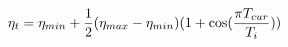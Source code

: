 \documentclass[preview]{standalone}
\begin{document}
\begin{align*}
\special{dvisvgm:raw <g id='unique000'>}\eta_t = \eta_{min} + \frac{1}{2}(\eta_{max} - \eta_{min}) \special{dvisvgm:raw </g>}\special{dvisvgm:raw <g id='unique001'>}(1 + \cos(\frac{\pi T_{cur}}{T_i}))\special{dvisvgm:raw </g>}
\end{align*}
\end{document}
